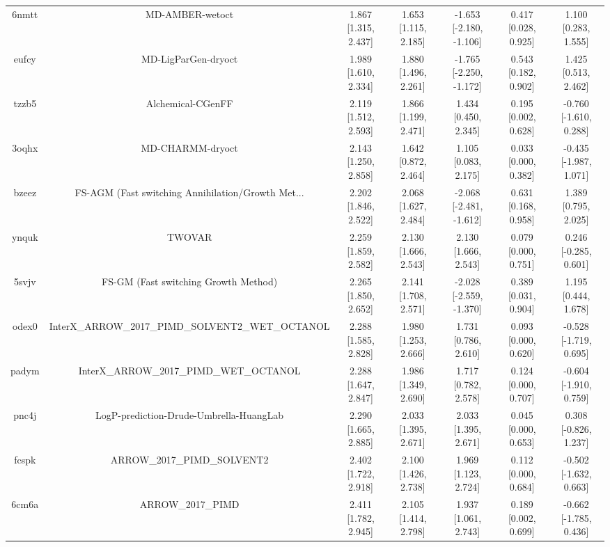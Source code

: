 \documentclass{article}
\begin{document}
\begin{center}
\begin{longtable}{|ccccccc|}
 6nmtt &                                    MD-AMBER-wetoct &  1.867 [1.315, 2.437] &  1.653 [1.115, 2.185] &  -1.653 [-2.180, -1.106] &  0.417 [0.028, 0.925] &    1.100 [0.283, 1.555] \\
 eufcy &                                MD-LigParGen-dryoct &  1.989 [1.610, 2.334] &  1.880 [1.496, 2.261] &  -1.765 [-2.250, -1.172] &  0.543 [0.182, 0.902] &    1.425 [0.513, 2.462] \\
 tzzb5 &                                  Alchemical-CGenFF &  2.119 [1.512, 2.593] &  1.866 [1.199, 2.471] &     1.434 [0.450, 2.345] &  0.195 [0.002, 0.628] &  -0.760 [-1.610, 0.288] \\
 3oqhx &                                   MD-CHARMM-dryoct &  2.143 [1.250, 2.858] &  1.642 [0.872, 2.464] &     1.105 [0.083, 2.175] &  0.033 [0.000, 0.382] &  -0.435 [-1.987, 1.071] \\
 bzeez &  FS-AGM (Fast switching Annihilation/Growth Met... &  2.202 [1.846, 2.522] &  2.068 [1.627, 2.484] &  -2.068 [-2.481, -1.612] &  0.631 [0.168, 0.958] &    1.389 [0.795, 2.025] \\
 ynquk &                                             TWOVAR &  2.259 [1.859, 2.582] &  2.130 [1.666, 2.543] &     2.130 [1.666, 2.543] &  0.079 [0.000, 0.751] &   0.246 [-0.285, 0.601] \\
 5svjv &               FS-GM (Fast switching Growth Method) &  2.265 [1.850, 2.652] &  2.141 [1.708, 2.571] &  -2.028 [-2.559, -1.370] &  0.389 [0.031, 0.904] &    1.195 [0.444, 1.678] \\
 odex0 &  InterX\_ARROW\_2017\_PIMD\_SOLVENT2\_WET\_OCTANOL &  2.288 [1.585, 2.828] &  1.980 [1.253, 2.666] &     1.731 [0.786, 2.610] &  0.093 [0.000, 0.620] &  -0.528 [-1.719, 0.695] \\
 padym &            InterX\_ARROW\_2017\_PIMD\_WET\_OCTANOL &  2.288 [1.647, 2.847] &  1.986 [1.349, 2.690] &     1.717 [0.782, 2.578] &  0.124 [0.000, 0.707] &  -0.604 [-1.910, 0.759] \\
 pnc4j &            LogP-prediction-Drude-Umbrella-HuangLab &  2.290 [1.665, 2.885] &  2.033 [1.395, 2.671] &     2.033 [1.395, 2.671] &  0.045 [0.000, 0.653] &   0.308 [-0.826, 1.237] \\
 fcspk &                        ARROW\_2017\_PIMD\_SOLVENT2 &  2.402 [1.722, 2.918] &  2.100 [1.426, 2.738] &     1.969 [1.123, 2.724] &  0.112 [0.000, 0.684] &  -0.502 [-1.632, 0.663] \\
 6cm6a &                                  ARROW\_2017\_PIMD &  2.411 [1.782, 2.945] &  2.105 [1.414, 2.798] &     1.937 [1.061, 2.743] &  0.189 [0.002, 0.699] &  -0.662 [-1.785, 0.436] \\

\end{longtable}
\end{center}
\end{document}
